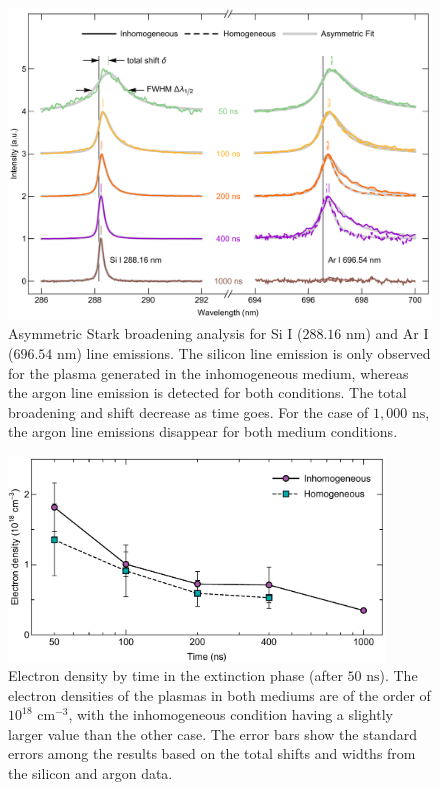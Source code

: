 \begin{figure}[t!]
\centering
\includegraphics[width=130mm]{figures/ch4/Stark/fit.pdf}
\caption{Asymmetric Stark broadening analysis for Si I ($288.16 \text{ nm}$) and Ar I ($696.54 \text{ nm}$) line emissions. The silicon line emission is only observed for the plasma generated in the inhomogeneous medium, whereas the argon line emission is detected for both conditions. The total broadening and shift decrease as time goes. For the case of $1,000 \text{ ns}$, the argon line emissions disappear for both medium conditions.}
\label{fig:StarkFit}
\end{figure}

\begin{figure}[ht!]
\centering
\includegraphics[width=100mm]{figures/ch4/Stark/density.pdf}
\caption{Electron density by time in the extinction phase (after $50 \text{ ns}$). The electron densities of the plasmas in both mediums are of the order of $10^{18} \text{ cm}^{-3}$, with the inhomogeneous condition having a slightly larger value than the other case. The error bars show the standard errors among the results based on the total shifts and widths from the silicon and argon data.}
\label{fig:StarkDensity}
\end{figure}

